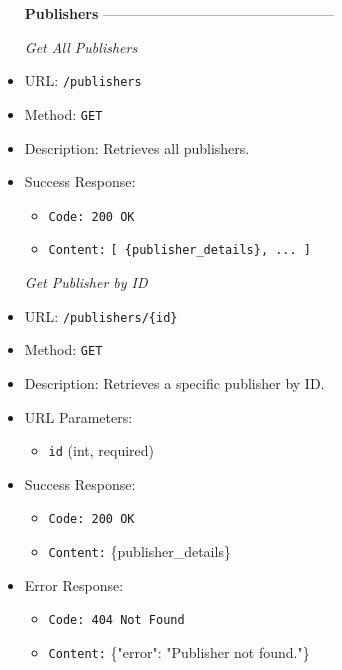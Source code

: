 \begin{itemize}
\item[\textbf{Publishers}] --------------------------------------------------

\item[\textit{Get All Publishers}]
\item URL: \texttt{/publishers}  
\item Method: \texttt{GET}  
\item Description: Retrieves all publishers.
\item Success Response:
\begin{itemize}
  \item \texttt{Code: 200 OK}
  \item \texttt{Content:} \texttt{[ \{publisher\_details\}, ... ]}
\end{itemize}


\item[\textit{Get Publisher by ID}] 
\item URL: \texttt{/publishers/\{id\}}  
\item Method: \texttt{GET}  
\item Description: Retrieves a specific publisher by ID.
\item URL Parameters:
\begin{itemize}
  \item \texttt{id} (int, required)
\end{itemize}
\item Success Response:
\begin{itemize}
  \item \texttt{Code: 200 OK}
  \item \texttt{Content:} \{publisher\_details\}
\end{itemize}
\item Error Response:
\begin{itemize}
  \item \texttt{Code: 404 Not Found}  
  \item \texttt{Content:} \{"error": "Publisher not found."\}
\end{itemize}



\end{itemize}
